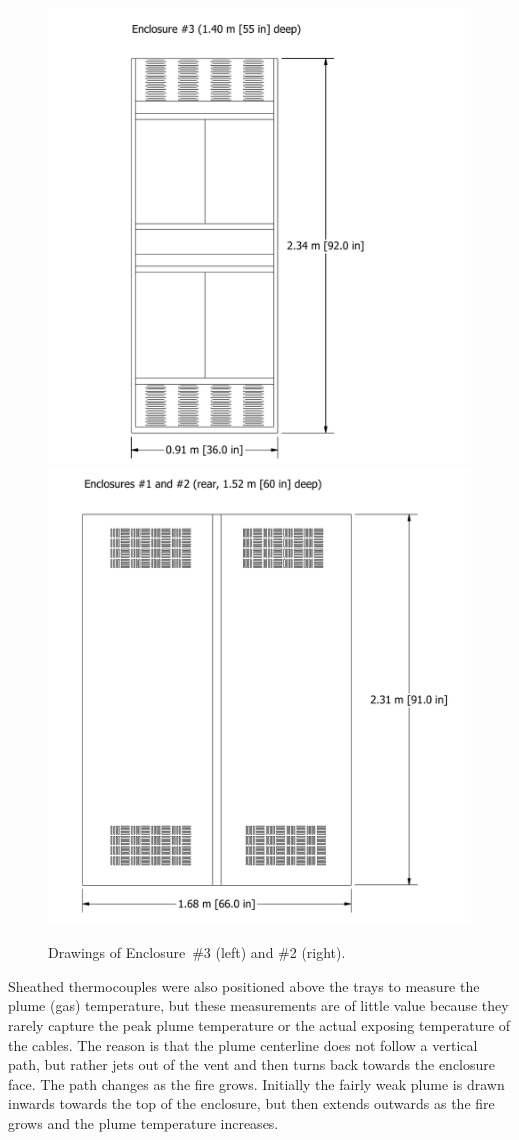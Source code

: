 \documentclass[12pt]{article}
\begin{document}
\begin{figure}[!ht]
\hspace*{-0.75in}\includegraphics[height=4.75in]{../FIGURES/Cabinet_3}
\hspace*{-1.25in}\includegraphics[height=4.75in]{../FIGURES/Cabinet_1}
\caption[Drawings of Enclosures \#2 and \#3]{Drawings of Enclosure~\#3 (left) and \#2 (right).}
\label{fig:enclosure_drawings}
\end{figure}
Sheathed thermocouples were also positioned above the trays to measure the plume (gas) temperature, but these measurements are of little value because they rarely capture the peak plume temperature or the actual exposing temperature of the cables. The reason is that the plume centerline does not follow a vertical path, but rather jets out of the vent and then turns back towards the enclosure face. The path changes as the fire grows. Initially the fairly weak plume is drawn inwards towards the top of the enclosure, but then extends outwards as the fire grows and the plume temperature increases.
\end{document}
